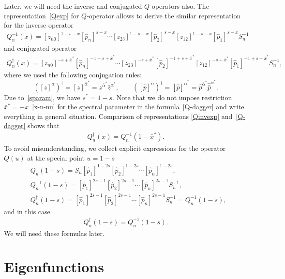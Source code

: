 \documentclass[pdftex]{sigma}
\numberwithin{equation}{section}
\begin{document}
Later, we will need the inverse and conjugated $Q$-operators also.
The representation~\eqref{Qexp} for $Q$-operator allows to derive
the similar representation for the inverse operator
\begin{align}\label{Qinvexp}
Q^{-1}_n(x) = [z_{n0}]^{1-s-x} [\hat{p}_n]^{s-x}
\cdots
[z_{23}]^{1-s-x} [\hat{p}_2]^{s-x}
[z_{12}]^{1-s-x} [\hat{p}_1]^{s-x} S_n^{-1}
\end{align}
and conjugated operator
\begin{align}\label{Q-dagger}
Q^{\dagger}_n(x) = [z_{n0}]^{-s+\bar{x}^*} [\hat{p}_n]^{-1+s+\bar{x}^*}
\cdots
[z_{23}]^{-s+\bar{x}^*} [\hat{p}_2]^{-1+s+\bar{x}^*}
[z_{12}]^{-s+\bar{x}^*} [\hat{p}_1]^{-1+s+\bar{x}^*} S_n^{-1},
\end{align}
where we used the following conjugation rules:
\begin{equation*}
([z]^{\alpha})^{\dagger} =
[z]^{\bar{\alpha}^*} =
z^{\bar{\alpha}^*} \bar{z}^{\alpha^*},\qquad ([\hat{p}]^{\alpha})^{\dagger} =
[\hat{p}]^{\bar{\alpha}^*} = \hat{p}^{\bar{\alpha}^*}
\hat{\bar{p}}^{\alpha^*}.
\end{equation*}
Due to~\eqref{sparam}, we have $\bar{s}^* = 1-s$.
Note that we do not impose restriction $\bar{x}^* = -x$~\eqref{x-n-nu}
for the spectral parameter in the formula~\eqref{Q-dagger}
and write everything in general situation.
Comparison of representations
\eqref{Qinvexp} and~\eqref{Q-dagger} shows that
\begin{align} \label{QdagQinv}
Q^{\dagger}_n(x) = Q^{-1}_n(1-\bar{x}^*) .
\end{align}
To avoid misunderstanding, we collect explicit expressions for the operator $Q(u)$
at the special point $u = 1-s$
\begin{align*}
&
Q_n(1-s) = S_n
[\hat{p}_1]^{1-2s}
[\hat{p}_2]^{1-2s} \cdots [\hat{p}_n]^{1-2s} , \\
&
Q^{-1}_n(1-s) =
[\hat{p}_1]^{2s-1}
[\hat{p}_2]^{2s-1} \cdots [\hat{p}_n]^{2s-1} S^{-1}_n , \\
&
Q^{\dagger}_n(1-s) =
[\hat{p}_1]^{2s-1}
[\hat{p}_2]^{2s-1} \cdots [\hat{p}_n]^{2s-1} S^{-1}_n
= Q^{-1}_n(1-s) ,
\end{align*}
and in this case
\begin{align*}
Q^{\dagger}_n(1-s) = Q^{-1}_n(1-s) .
\end{align*}
We will need these formulas later.

\section{Eigenfunctions}\label{sect:eigen}
\end{document}
